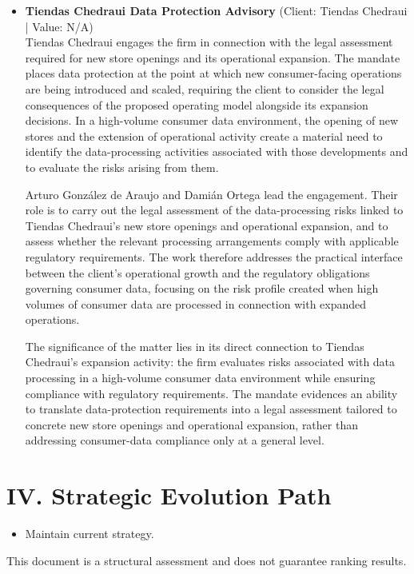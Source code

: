 \documentclass[11pt]{article}
\begin{document}
\begin{itemize}
The stated result was an improvement in regulatory compliance and the integration of data protection into Grupo Modelquipo’s governance culture. This is significant because the engagement evidences a governance-led approach to data protection: Arturo González de Araujo, Ernesto Zavala and Damián Ortega supported Grupo Modelquipo in connecting implementation, risk management and compliance with the client’s wider corporate governance strategy. The matter therefore demonstrates the team’s ability to translate data protection requirements into an integrated governance-culture initiative with a defined compliance objective.
\item \textbf{Tiendas Chedraui Data Protection Advisory} (Client: Tiendas Chedraui | Value: N/A)\\ Tiendas Chedraui engages the firm in connection with the legal assessment required for new store openings and its operational expansion. The mandate places data protection at the point at which new consumer-facing operations are being introduced and scaled, requiring the client to consider the legal consequences of the proposed operating model alongside its expansion decisions. In a high-volume consumer data environment, the opening of new stores and the extension of operational activity create a material need to identify the data-processing activities associated with those developments and to evaluate the risks arising from them.

Arturo González de Araujo and Damián Ortega lead the engagement. Their role is to carry out the legal assessment of the data-processing risks linked to Tiendas Chedraui’s new store openings and operational expansion, and to assess whether the relevant processing arrangements comply with applicable regulatory requirements. The work therefore addresses the practical interface between the client’s operational growth and the regulatory obligations governing consumer data, focusing on the risk profile created when high volumes of consumer data are processed in connection with expanded operations.

The significance of the matter lies in its direct connection to Tiendas Chedraui’s expansion activity: the firm evaluates risks associated with data processing in a high-volume consumer data environment while ensuring compliance with regulatory requirements. The mandate evidences an ability to translate data-protection requirements into a legal assessment tailored to concrete new store openings and operational expansion, rather than addressing consumer-data compliance only at a general level.

\end{itemize}

\section*{IV. Strategic Evolution Path}
\begin{itemize}
\item Maintain current strategy.
\end{itemize}

\vfill
\centering
\small{This document is a structural assessment and does not guarantee ranking results.}
\end{document}
